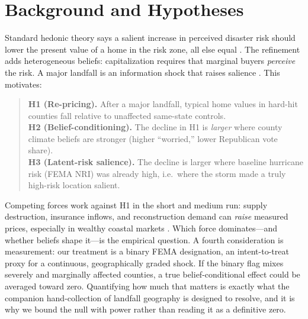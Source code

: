 \documentclass[12pt]{article}
\begin{document}
\section{Background and Hypotheses}\label{sec:bg}
Standard hedonic theory says a salient increase in perceived disaster risk should lower the
present value of a home in the risk zone, all else equal \citep{bin2013,ortega2018}. The
\citet{baldauf2020} refinement adds heterogeneous beliefs: capitalization requires that
marginal buyers \emph{perceive} the risk. A major landfall is an information shock that raises
salience \citep{gallagher2014,hino2021}. This motivates:
\begin{quote}
\textbf{H1 (Re-pricing).} After a major landfall, typical home values in hard-hit counties
fall relative to unaffected same-state controls.\\[2pt]
\textbf{H2 (Belief-conditioning).} The decline in H1 is \emph{larger} where county climate
beliefs are stronger (higher ``worried,'' lower Republican vote share).\\[2pt]
\textbf{H3 (Latent-risk salience).} The decline is larger where baseline hurricane risk
(FEMA NRI) was already high, i.e.\ where the storm made a truly high-risk location salient.
\end{quote}
Competing forces work against H1 in the short and medium run: supply destruction, insurance
inflows, and reconstruction demand can \emph{raise} measured prices, especially in wealthy
coastal markets \citep{ortega2018}. Which force dominates---and whether beliefs shape
it---is the empirical question. A fourth consideration is measurement: our treatment is a
binary FEMA designation, an intent-to-treat proxy for a continuous, geographically graded
shock. If the binary flag mixes severely and marginally affected counties, a true
belief-conditional effect could be averaged toward zero. Quantifying how much that matters is
exactly what the companion hand-collection of landfall geography is designed to resolve, and
it is why we bound the null with power rather than reading it as a definitive zero.
\end{document}
